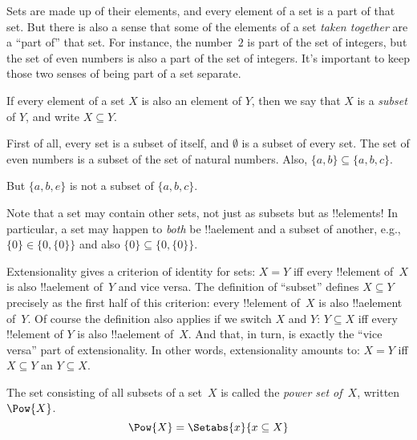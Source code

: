 \documentclass[../../../include/open-logic-section]{subfiles}
\begin{document}

\begin{explain}
Sets are made up of their elements, and every element of a set is a
part of that set. But there is also a sense that some of the elements
of a set \emph{taken together} are a ``part of'' that set. For
instance, the number~$2$ is part of the set of integers, but the set
of even numbers is also a part of the set of integers. It's important
to keep those two senses of being part of a set separate.
\end{explain}

\begin{defn}
If every element of a set $X$ is also an element of
    $Y$, then we say that $X$ is a \emph{subset} of $Y$, and write $X
    \subseteq Y$.
\end{defn}

\begin{ex}
First of all, every set is a subset of itself, and $\emptyset$ is a
subset of every set. The set of even numbers is a subset of the set of
natural numbers. Also, $\{ a, b \} \subseteq \{ a, b, c \}$.

But $\{ a, b, e \}$ is not a subset of $\{ a, b, c \}$.
\end{ex}

\begin{explain}
Note that a set may contain other sets, not just as subsets but as
!!{element}s!{} In particular, a set may happen to \emph{both} be 
!!a{element} and a subset of another, e.g., $\{0\} \in \{0, \{0\}\}$
and also $\{0\} \subseteq \{0, \{0\}\}$.
\end{explain}

\begin{explain}
Extensionality gives a criterion of identity for sets: $X = Y$ iff
every !!{element} of~$X$ is also !!a{element} of~$Y$ and vice versa.
The definition of ``subset'' defines $X \subseteq Y$ precisely as the first
half of this criterion: every !!{element} of~$X$ is also !!a{element}
of~$Y$.  Of course the definition also applies if we switch $X$ and
$Y$: $Y \subseteq X$ iff every !!{element} of $Y$ is also !!a{element}
of~$X$.  And that, in turn, is exactly the ``vice versa'' part of
extensionality.  In other words, extensionality amounts to: $X = Y$
iff $X \subseteq Y$ an $Y \subseteq X$.
\end{explain}

\begin{defn}
The set consisting of all subsets of a set~$X$ is called the
\emph{power set of}~$X$, written $\Pow{X}$.
    \[\Pow{X} = \Setabs{x}{x \subseteq X} \]
\end{defn}
\end{document}
